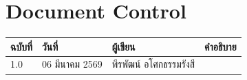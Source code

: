 \documentclass{easreport}
\begin{document}
	
	\maketitle
	
	\newpage
	\section{Document Control}
	\begin{table}[htbp]
		\centering
		\begin{tabularx}{\textwidth}{|X|X|X|X|}
			\hline
			ฉบับที่ & วันที่ & ผู้เขียน & คำอธิบาย \\ \hline
			1.0 & 06 มีนาคม 2569 & พีรพัฒน์ อโศกธรรมรังสี & \\ \hline
		\end{tabularx}
	\end{table}
	
	\newpage
	\tableofcontents
	\newpage










\end{document}
